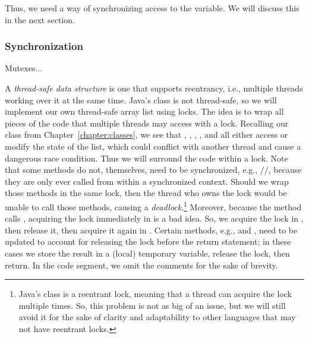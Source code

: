 Thus, we need a way of synchronizing access to the  variable. We will discuss this in the next section.

\subsubsection*{Synchronization}

\example Mutexes...

\example A \textit{thread-safe data structure} is one that supports reentrancy, i.e., multiple threads working over it at the same time. Java's  class is not thread-safe, so we will implement our own thread-safe array list using locks. The idea is to wrap all pieces of the code that multiple threads may access with a lock. Recalling our  class from Chapter~\ref{chapter:classes}, we see that , , , , and  all either access or modify the state of the list, which could conflict with another thread and cause a dangerous race condition. Thus we will surround the code within a lock. Note that some methods do not, themselves, need to be synchronized, e.g., //, because they are only ever called from within a synchronized context. Should we wrap those methods in the same lock, then the thread who owns the lock would be unable to call those methods, causing a \textit{deadlock}.\footnote{Java's  class is a reentrant lock, meaning that a thread can acquire the lock multiple times. So, this problem is not as big of an issue, but we will still avoid it for the sake of clarity and adaptability to other languages that may not have reentrant locks.} Moreover, because the  method calls , acquiring the lock immediately in  is a bad idea. So, we acquire the lock in , then release it, then acquire it again in . Certain methods, e.g.,  and , need to be updated to account for releasing the lock before the return statement; in these cases we store the result in a (local) temporary variable, release the lock, then return. In the code segment, we omit the comments for the sake of brevity.

